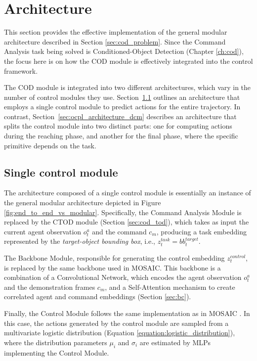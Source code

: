 \section{Architecture}
\label{sec:ocpl_architecture}
This section provides the effective implementation of the general modular architecture described in Section \ref{sec:cod_problem}. Since the Command Analysis task being solved is Conditioned-Object Detection (Chapter \ref{ch:cod}), the focus here is on how the COD module is effectively integrated into the control framework.

The COD module is integrated into two different architectures, which vary in the number of control modules they use. Section~\ref{sec:ocpl_architecture_scm} outlines an architecture that employs a single control module to predict actions for the entire trajectory. In contrast, Section~\ref{sec:ocpl_architecture_dcm} describes an architecture that splits the control module into two distinct parts: one for computing actions during the reaching phase, and another for the final phase, where the specific primitive depends on the task.

\subsection{Single control module}
\label{sec:ocpl_architecture_scm}
The architecture composed of a single control module is essentially an instance of the general modular architecture depicted in Figure \ref{fig:end_to_end_vs_modular}. Specifically, the Command Analysis Module is replaced by the CTOD module (Section \ref{sec:cod_tod}), which takes as input the current agent observation $o^a_t$ and the command $c_m$, producing a task embedding represented by the \textit{target-object bounding box}, i.e., $z^{task}_t = bb^{target}_t$.

The Backbone Module, responsible for generating the control embedding $z^{control}_{t}$, is replaced by the same backbone used in MOSAIC. This backbone is a combination of a Convolutional Network, which encodes the agent observation $o^a_t$ and the demonstration frames $c_m$, and a Self-Attention mechanism to create correlated agent and command embeddings (Section \ref{sec:bc}). 

Finally, the Control Module follows the same implementation as in MOSAIC \cite{mandi2022towards_more_generalizable_one_shot}. In this case, the actions generated by the control module are sampled from a multivariate logistic distribution (Equation \ref{equation:logistic_distribution}), where the distribution parameters $\mu_{i}$ and $\sigma_{i}$ are estimated by MLPs implementing the Control Module.

